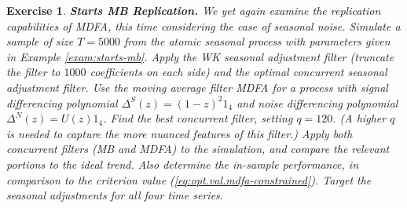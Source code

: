 \documentclass[a4paper]{book}
\newtheorem{Exercise}{Exercise}
\begin{document}
 
\begin{Exercise} {\bf Starts MB Replication.}  \rm
\label{exer:starts-mb1}
 We yet again examine the replication capabilities of MDFA, 
  this time considering the case of seasonal noise.
 Simulate a sample of size $T=5000$ from the atomic seasonal
  process  with parameters
 given in Example \ref{exam:starts-mb}.   Apply the WK seasonal adjustment filter
(truncate the filter to $1000$ coefficients on each side) and the 
 optimal concurrent seasonal adjustment filter.  
 Use the moving average filter  MDFA  for a process with signal
 differencing polynomial $\Delta^S (z) = {(1-z)}^2 1_4$ and noise 
  differencing polynomial $\Delta^N (z) = U(z) 1_4$.  Find the best
 concurrent filter, setting $q= 120$.
 (A higher $q$ is needed to capture the more nuanced features of this filter.)
    Apply both concurrent filters (MB and MDFA)
 to the simulation, and compare the relevant portions to the ideal trend.
 Also determine the in-sample performance, in comparison to the criterion value
 (\ref{eq:opt.val.mdfa-constrained}).   Target the seasonal adjustments
 for all four time series.
\end{Exercise}
 
\end{document}
